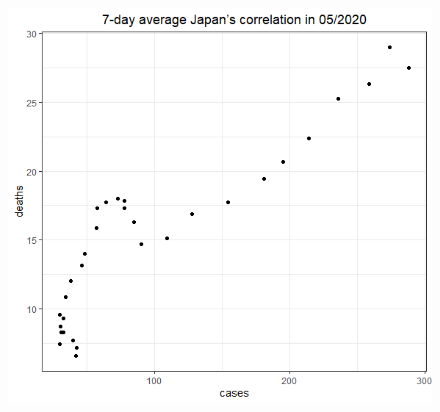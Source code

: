 \documentclass[english,10pt,table]{beamer}
\begin{document}
{\begin{figure}[H]
\begin{center}
        \includegraphics[scale = 0.2]{ix/ix.3/JPN_05_2020.png}
    \end{center}
    \end{figure}
}
\end{document}
